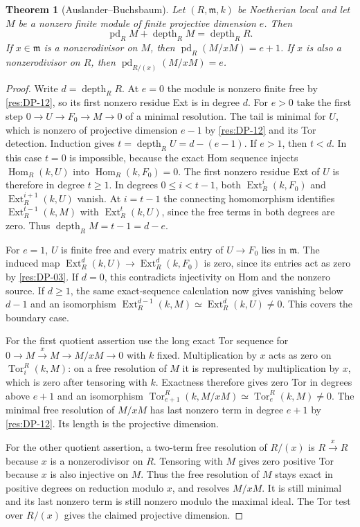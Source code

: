 \documentclass[11pt,oneside,openany]{book}
\newtheorem{theorem}{Theorem}[chapter]
\theoremstyle{definition}
\theoremstyle{remark}
\begin{document}
\begin{theorem}[Auslander--Buchsbaum]\label{res:DP-13}
Let $(R,\mathfrak m,k)$ be Noetherian local and let $M$ be a nonzero
finite module of finite projective dimension $e$. Then
\[
 \operatorname{pd}_R M+\operatorname{depth}_R M
   =\operatorname{depth}_R R.
\]
If $x\in\mathfrak m$ is a nonzerodivisor on $M$, then
$\operatorname{pd}_R(M/xM)=e+1$. If $x$ is also a nonzerodivisor
on $R$, then $\operatorname{pd}_{R/(x)}(M/xM)=e$.
\end{theorem}
\begin{proof}
Write $d=\operatorname{depth}_R R$. At $e=0$ the module is nonzero
finite free by \ref{res:DP-12}, so its first nonzero residue Ext is
in degree $d$. For $e>0$ take the first step
$0\to U\to F_0\to M\to0$ of a minimal resolution. The tail is
minimal for $U$, which is nonzero of projective dimension $e-1$
by \ref{res:DP-12} and its Tor detection. Induction gives
$t=\operatorname{depth}_R U=d-(e-1)$. If $e>1$, then $t<d$.
In this case $t=0$ is impossible, because the exact Hom sequence
injects $\operatorname{Hom}_R(k,U)$ into
$\operatorname{Hom}_R(k,F_0)=0$. The first nonzero residue Ext of
$U$ is therefore in degree $t\ge1$. In degrees $0\le i<t-1$,
both $\operatorname{Ext}_R^i(k,F_0)$ and
$\operatorname{Ext}_R^{i+1}(k,U)$ vanish. At $i=t-1$ the connecting
homomorphism identifies $\operatorname{Ext}_R^{t-1}(k,M)$ with
$\operatorname{Ext}_R^t(k,U)$, since the free terms in both
degrees are zero. Thus $\operatorname{depth}_R M=t-1=d-e$.

For $e=1$, $U$ is finite free and every matrix entry of $U\to F_0$
lies in $\mathfrak m$. The induced map
$\operatorname{Ext}^d_R(k,U)\to\operatorname{Ext}^d_R(k,F_0)$
is zero, since its entries act as zero by \ref{res:DP-03}.
If $d=0$, this contradicts injectivity on Hom and the nonzero
source. If $d\ge1$, the same exact-sequence calculation now gives
vanishing below $d-1$ and an isomorphism
$\operatorname{Ext}_R^{d-1}(k,M)\simeq\operatorname{Ext}_R^d(k,U)\ne0$.
This covers the boundary case.

For the first quotient assertion use the long exact Tor sequence
for $0\to M\xrightarrow{x}M\to M/xM\to0$ with $k$ fixed.
Multiplication by $x$ acts as zero on $\operatorname{Tor}_i^R(k,M)$:
on a free resolution of $M$ it is represented by multiplication by
$x$, which is zero after tensoring with $k$. Exactness therefore
gives zero Tor in degrees above $e+1$ and an isomorphism
$\operatorname{Tor}_{e+1}^R(k,M/xM)\simeq\operatorname{Tor}_e^R(k,M)\ne0$.
The minimal free resolution of $M/xM$ has last nonzero term in
degree $e+1$ by \ref{res:DP-12}. Its length is the projective dimension.

For the other quotient assertion, a two-term free resolution of $R/(x)$
is $R\xrightarrow{x}R$ because $x$ is a nonzerodivisor on $R$.
Tensoring with $M$ gives zero positive Tor because $x$ is also
injective on $M$. Thus the free resolution of $M$ stays exact in
positive degrees on reduction modulo $x$, and resolves $M/xM$.
It is still minimal and its last nonzero term is still nonzero
modulo the maximal ideal. The Tor test over $R/(x)$ gives the claimed
projective dimension.
\end{proof}
\end{document}

